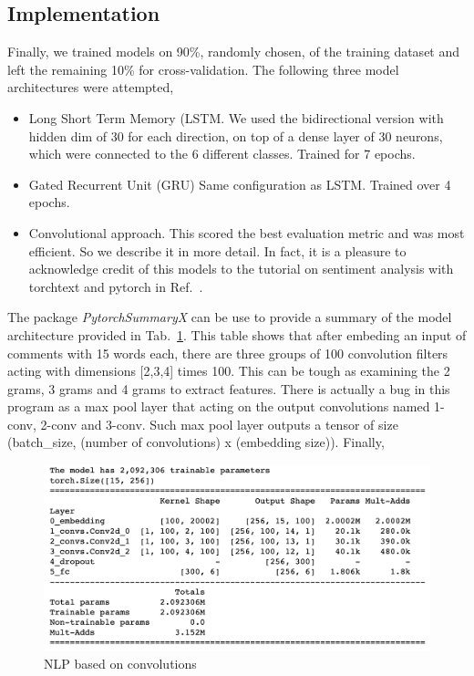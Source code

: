 \documentclass{report}
\begin{document}
\subsection{Implementation}

Finally, we trained models on 90\%, randomly chosen, of the training dataset and left the remaining 10\% 
for cross-validation. The following three model architectures were attempted, 
\begin{itemize}
\item Long Short Term Memory (LSTM. We used the 
bidirectional version with hidden dim of 30 for each direction, on top of a dense layer of 30 neurons, 
which were connected to the 6 different classes. Trained for 7 epochs. 

\item Gated Recurrent Unit (GRU) Same configuration 
as LSTM. Trained over 4 epochs. 
\item Convolutional approach. This scored the best evaluation metric
and was most efficient. So we describe it in more detail. In fact, it is a pleasure
to acknowledge credit of this models to the tutorial on sentiment analysis with 
torchtext and pytorch in Ref.~\cite{BT}.
\end{itemize}

The package \emph{PytorchSummaryX} can be use to provide a summary of the model architecture provided 
in Tab.~\ref{fig:cnn}. This table shows that after embeding an input of comments with 15 words each, there are 
three groups of 100 convolution filters acting with dimensions [2,3,4] times 100. This can be tough as examining the 
2 grams, 3 grams and 4 grams to extract features.  There is actually a bug in this program as a max pool layer that acting
on the output convolutions named 1-conv,  2-conv and 3-conv. Such max pool layer outputs a tensor of size 
(batch\_size, (number of convolutions) x (embedding size)). Finally, 
\begin{figure}[!h]
\centering
  \includegraphics[width=150mm]{../local/plots_tables/cnn.png}
  \caption{NLP based on convolutions}
  \label{fig:cnn}
\end{figure}
\end{document}
